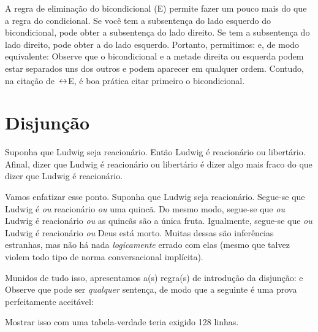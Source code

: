 A regra de eliminação do bicondicional ({\eiff}E) permite fazer um pouco mais do que a regra do condicional. Se você tem a subsentença do lado esquerdo do bicondicional, pode obter a subsentença do lado direito. Se tem a subsentença do lado direito, pode obter a do lado esquerdo. Portanto, permitimos:
e, de modo equivalente:
Observe que o bicondicional e a metade direita ou esquerda podem estar
separados uns dos outros e podem aparecer em qualquer ordem. Contudo,
na citação de~$\leftrightarrow$E, é boa prática citar primeiro o bicondicional.

\section{Disjunção}
Suponha que Ludwig seja reacionário. Então Ludwig é reacionário ou libertário. Afinal, dizer que Ludwig é reacionário ou libertário é dizer algo mais fraco do que dizer que Ludwig é reacionário.

Vamos enfatizar esse ponto. Suponha que Ludwig seja reacionário. Segue-se que Ludwig é \emph{ou} reacionário \emph{ou} uma quincã. Do mesmo modo, segue-se que \emph{ou} Ludwig é reacionário \emph{ou} as quincãs são a única fruta. Igualmente, segue-se que \emph{ou} Ludwig é reacionário \emph{ou} Deus está morto. Muitas dessas são inferências estranhas, mas não há nada \emph{logicamente} errado com elas (mesmo que talvez violem todo tipo de norma conversacional implícita).

Munidos de tudo isso, apresentamos a(s) regra(s) de introdução da disjunção:
e
Observe que  pode ser \emph{qualquer} sentença, de modo que a seguinte é uma prova perfeitamente aceitável:
\begin{fitchproof}
	\PR
\end{fitchproof}
Mostrar isso com uma tabela-verdade teria exigido 128 linhas.

